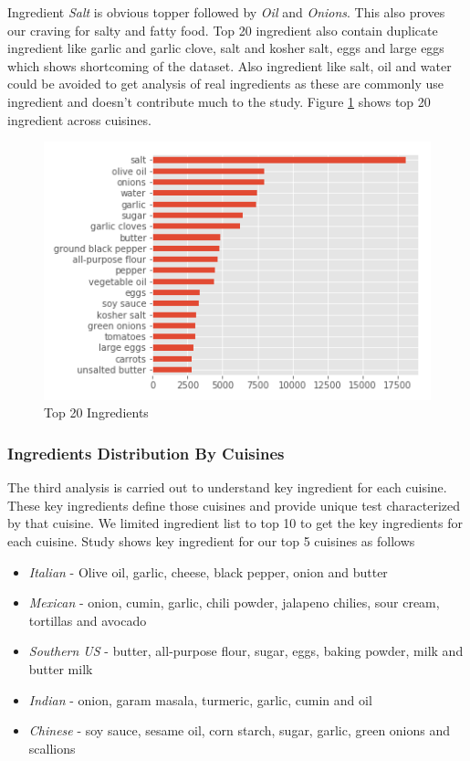\documentclass[sigconf]{acmart}
\begin{document}
Ingredient \emph{Salt} is obvious topper followed by \emph{Oil} and \emph{Onions}. This also proves our craving for salty and fatty food. Top 20 ingredient also contain duplicate ingredient like garlic and garlic clove, salt and kosher salt, eggs and large eggs which shows shortcoming of the dataset. Also ingredient like salt, oil and water could be avoided to get analysis of real ingredients as these are commonly use ingredient and doesn't contribute much to the study. Figure \ref{f:Ingredient_Distribution} shows top 20 ingredient across cuisines. 
\begin{figure}[!ht]
  \centering\includegraphics[width=\columnwidth]{images/Ingredient_Distribution.png}
  \caption{Top 20 Ingredients }\label{f:Ingredient_Distribution}
\end{figure}

\subsubsection{Ingredients Distribution By Cuisines}
The third analysis is carried out to understand key ingredient for each cuisine. These key ingredients define those cuisines and provide unique test characterized by that cuisine. We limited ingredient list to top 10 to get the key ingredients for each cuisine. Study shows key ingredient for our top 5 cuisines as follows
\begin{itemize}
\item \emph{Italian} - Olive oil, garlic, cheese, black pepper, onion and butter
\item \emph{Mexican} - onion, cumin, garlic, chili powder, jalapeno chilies, sour cream, tortillas and avocado
\item \emph{Southern US} - butter, all-purpose flour, sugar, eggs, baking powder, milk and butter milk
\item \emph{Indian} - onion, garam masala, turmeric, garlic, cumin and oil
\item \emph{Chinese} - soy sauce, sesame oil, corn starch, sugar, garlic, green onions and scallions
\end{itemize}
\end{document}
